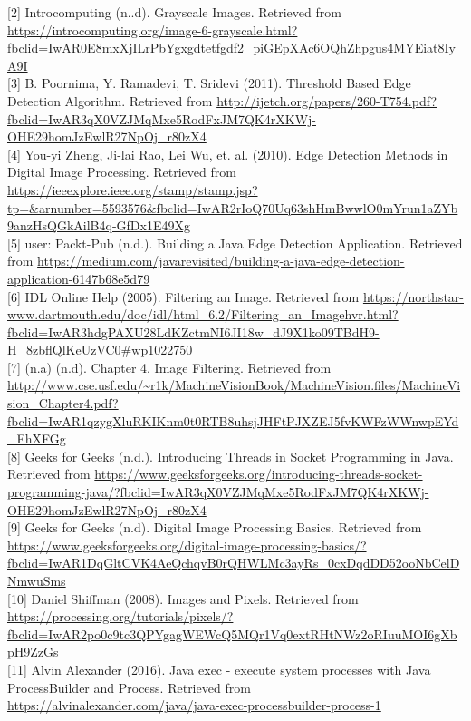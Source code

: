 \documentclass[a4paper,12pt]{article}
\begin{document}
	[2] Introcomputing (n..d). Grayscale Images. Retrieved from \url{https://introcomputing.org/image-6-grayscale.html?fbclid=IwAR0E8mxXjILrPbYgxgdtetfgdf2_piGEpXAc6OQhZhpgus4MYEiat8IyA9I}\\
	
	[3] B. Poornima, Y. Ramadevi, T. Sridevi (2011). Threshold Based Edge Detection Algorithm. Retrieved from \url{http://ijetch.org/papers/260-T754.pdf?fbclid=IwAR3qX0VZJMqMxe5RodFxJM7QK4rXKWj-OHE29homJzEwlR27NpOj_r80zX4}\\
	
	[4] You-yi Zheng, Ji-lai Rao, Lei Wu, et. al. (2010). Edge Detection Methods in Digital Image Processing. Retrieved from \url{https://ieeexplore.ieee.org/stamp/stamp.jsp?tp=&arnumber=5593576&fbclid=IwAR2rIoQ70Uq63shHmBwwlO0mYrun1aZYb9anzHsQGkAilB4q-GfDx1E49Xg}\\
	
	[5] user: Packt-Pub (n.d.). Building a Java Edge Detection Application. Retrieved from \url{https://medium.com/javarevisited/building-a-java-edge-detection-application-6147b68e5d79}\\
		
	[6] IDL Online Help (2005). Filtering an Image. Retrieved from \url{https://northstar-www.dartmouth.edu/doc/idl/html_6.2/Filtering_an_Imagehvr.html?fbclid=IwAR3hdgPAXU28LdKZctmNI6JI18w_dJ9X1ko09TBdH9-H_8zbflQlKeUzVC0#wp1022750}\\
	
	[7] (n.a) (n.d). Chapter 4. Image Filtering. Retrieved from \url{http://www.cse.usf.edu/~r1k/MachineVisionBook/MachineVision.files/MachineVision_Chapter4.pdf?fbclid=IwAR1qzygXluRKIKnm0t0RTB8uhsjJHFtPJXZEJ5fvKWFzWWnwpEYd_FhXFGg}\\
	
	[8] Geeks for Geeks (n.d.). Introducing Threads in Socket Programming in Java. Retrieved from \url{https://www.geeksforgeeks.org/introducing-threads-socket-programming-java/?fbclid=IwAR3qX0VZJMqMxe5RodFxJM7QK4rXKWj-OHE29homJzEwlR27NpOj_r80zX4}\\
	
	[9]	Geeks for Geeks (n.d). Digital Image Processing Basics. Retrieved from \url{https://www.geeksforgeeks.org/digital-image-processing-basics/?fbclid=IwAR1DqGltCVK4AeQchqvB0rQHWLMc3ayRs_0cxDqdDD52ooNbCelDNmwuSms}\\
	
	[10] Daniel Shiffman (2008). Images and Pixels. Retrieved from \url{https://processing.org/tutorials/pixels/?fbclid=IwAR2po0c9tc3QPYgagWEWcQ5MQr1Vq0extRHtNWz2oRIuuMOI6gXbpH9ZzGs}\\
	
	[11] Alvin Alexander (2016). Java exec - execute system processes with Java ProcessBuilder and Process. Retrieved from \url{https://alvinalexander.com/java/java-exec-processbuilder-process-1}\\
	
\end{document}
